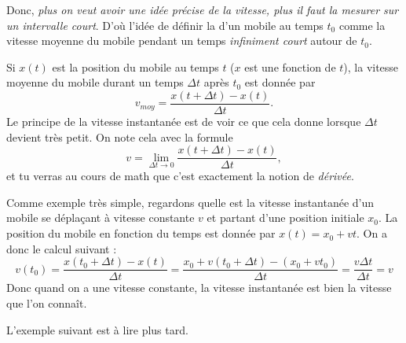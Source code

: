 Donc, \emph{plus on veut avoir une idée précise de la vitesse, plus il faut la mesurer sur un intervalle court}. D'où l'idée de définir la  d'un mobile au temps $t_0$ comme la vitesse moyenne du mobile pendant un temps \emph{infiniment court} autour de $t_0$. 

Si $x(t)$ est la position du mobile au temps $t$ ($x$ est une fonction de $t$), la vitesse moyenne du mobile durant un temps $\Delta t$ après $t_0$ est donnée par
\[ 
  v_{moy}=\frac{ x(t+\Delta t) -x(t) }{ \Delta t }.
\]
Le principe de la vitesse instantanée est de voir ce que cela donne lorsque $\Delta t$ devient très petit. On note cela avec la formule
\[ 
  v=\lim_{\Delta t\to 0}\frac{ x(t+\Delta t) - x(t) }{ \Delta t },
\]
et tu verras au cours de math que c'est exactement la notion de \emph{dérivée}.

\begin{exemple}		\label{ExoDerrmouvunif}
Comme exemple très simple, regardons quelle est la vitesse instantanée d'un mobile se déplaçant à vitesse constante $v$ et partant d'une position initiale $x_0$. La position du mobile en fonction du temps est donnée par $x(t)=x_0+vt$. On a donc le calcul suivant :
\[ 
  v(t_0)=\frac{ x(t_0+\Delta t)-x(t) }{ \Delta t }=\frac{ x_0+v(t_0+\Delta t)-(x_0+vt_0) }{ \Delta t }=\frac{ v\Delta t }{ \Delta t }=v
\]
Donc quand on a une vitesse constante, la vitesse instantanée est bien la vitesse que l'on connaît.
\end{exemple}

L'exemple suivant est à lire plus tard.

